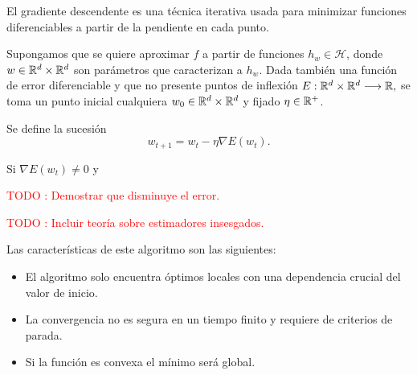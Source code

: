 El gradiente descendente es una técnica iterativa usada para minimizar funciones diferenciables
a partir de la pendiente en cada punto. 

Supongamos que se quiere aproximar $f$ a partir de funciones $h_w \in \mathcal{H}$, donde $w \in \mathbb{R}^d \times \mathbb{R}^d$ son parámetros que caracterizan a $h_w$.
Dada también una función de error diferenciable y que no presente puntos de inflexión
$E: \mathbb{R}^d \times \mathbb{R}^d \longrightarrow \mathbb{R},$
se toma un punto inicial  cualquiera $w_0 \in \mathbb{R}^d \times \mathbb{R}^d$ y 
fijado $\eta \in \mathbb{R}^+$. 

Se define la sucesión 
\begin{equation}
    w_{t+1}  = w_t - \eta \nabla E(w_t).
\end{equation}  

Si $\nabla E(w_t) \neq 0$ y 

\textcolor{red}{TODO : Demostrar que disminuye el error.}

\textcolor{red}{TODO : Incluir teoría sobre estimadores insesgados. }

Las características de este algoritmo son las siguientes: 

\begin{itemize}
    \item El algoritmo solo encuentra óptimos locales con una dependencia crucial del valor de inicio. 
    \item La convergencia no es segura en un tiempo finito y requiere de criterios de parada. 
    \item Si la función es convexa el mínimo será global. 
\end{itemize}
